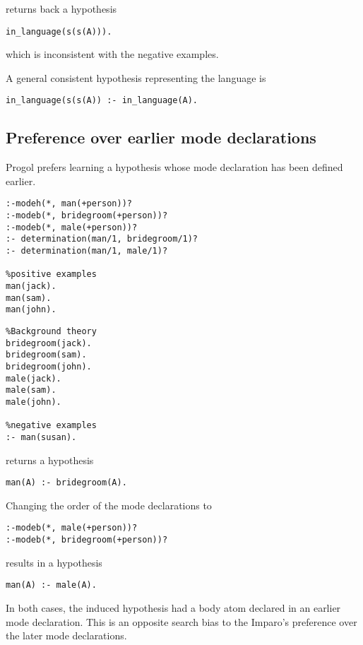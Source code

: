 returns back a hypothesis
\begin{lstlisting}
in_language(s(s(A))).
\end{lstlisting}
which is inconsistent with the negative examples.

A general consistent hypothesis representing the language is
\begin{lstlisting}
in_language(s(s(A)) :- in_language(A).
\end{lstlisting}

\subsection{Preference over earlier mode declarations}
Progol prefers learning a hypothesis whose mode declaration has been defined earlier.

\begin{minipage}[t]{.60\textwidth}
\begin{lstlisting}
:-modeh(*, man(+person))?
:-modeb(*, bridegroom(+person))?
:-modeb(*, male(+person))?
:- determination(man/1, bridegroom/1)?
:- determination(man/1, male/1)?

%positive examples
man(jack).
man(sam).
man(john).
\end{lstlisting}
\end{minipage}
\begin{minipage}[t]{.20\textwidth}
\begin{lstlisting}
%Background theory
bridegroom(jack).
bridegroom(sam).
bridegroom(john).
male(jack).
male(sam).
male(john).

%negative examples
:- man(susan).
\end{lstlisting}
\end{minipage}

returns a hypothesis
\begin{lstlisting}
man(A) :- bridegroom(A).
\end{lstlisting}

Changing the order of the mode declarations to
\begin{lstlisting}
:-modeb(*, male(+person))?
:-modeb(*, bridegroom(+person))?
\end{lstlisting}
results in a hypothesis
\begin{lstlisting}
man(A) :- male(A).
\end{lstlisting}
In both cases, the induced hypothesis had a body atom declared in an earlier mode declaration. This is an opposite search bias to the Imparo's preference over the later mode declarations.


